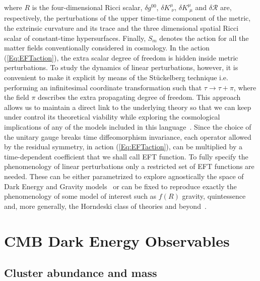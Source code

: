 %
where $R$ is the four-dimensional Ricci scalar, $\delta g^{00}$, $\delta K{^\mu_{\,\,\nu}}$, $\delta K{^\mu_{\,\,\mu}}$ and  $\delta \mathcal{R}$ are, respectively, the perturbations of the upper time-time component of the metric, the extrinsic curvature and its trace and the three dimensional spatial Ricci scalar of constant-time hypersurfaces. Finally,  $S_m$ denotes the action for all the matter fields conventionally considered in cosmology. In the action (\ref{Eq:EFTaction}), the  extra scalar degree of freedom is hidden inside metric perturbations. To study the dynamics of linear perturbations, however, it is convenient to make it explicit by means of  the St\"{u}ckelberg technique i.e. performing an infinitesimal coordinate transformation such that $\tau\rightarrow \tau+\pi$, where the field $\pi$ describes the extra propagating degree of freedom. This approach allows us to maintain a direct link to the underlying theory so that we can keep under control its theoretical viability while exploring the cosmological implications of any of the models included in this language~\cite{Raveri:2014cka}. Since the choice of the unitary gauge breaks time diffeomorphism invariance, each operator allowed by the residual symmetry, in action (\ref{Eq:EFTaction}), can be multiplied by a time-dependent coefficient that we shall call EFT function. To fully specify the phenomenology of linear perturbations only a restricted set of EFT functions are needed. These can be either parametrized to explore agnostically the space of Dark Energy and Gravity models~\cite{Gleyzes:2013ooa,Bloomfield:2013efa,Piazza:2013coa,Gleyzes:2014rba} or can be fixed to reproduce exactly the phenomenology of some model of interest such as $f(R)$ gravity, quintessence and, more generally, the Horndeski class of theories and beyond~\cite{Gleyzes:2014dya,Frusciante:2015maa,Frusciante:2016xoj}.
%
\section{CMB  Dark Energy Observables}

\subsection{Cluster abundance and mass}

